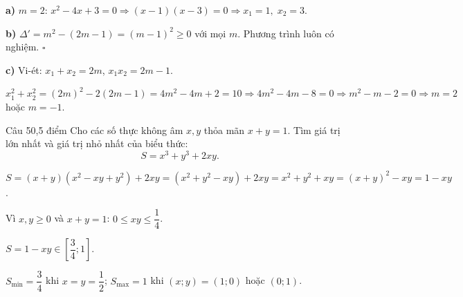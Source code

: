 \begin{loi_giai_cau}
\textbf{a)} $m=2$: $x^2-4x+3=0\Rightarrow(x-1)(x-3)=0\Rightarrow\boxed{x_1=1,\;x_2=3}$.

\textbf{b)} $\Delta'=m^2-(2m-1)=(m-1)^2\ge0$ với mọi $m$. Phương trình luôn có nghiệm. $\square$

\textbf{c)} Vi-ét: $x_1+x_2=2m$, $x_1x_2=2m-1$.

$x_1^2+x_2^2=(2m)^2-2(2m-1)=4m^2-4m+2=10\Rightarrow4m^2-4m-8=0\Rightarrow m^2-m-2=0\Rightarrow\boxed{m=2}$ hoặc $\boxed{m=-1}$.
\end{loi_giai_cau}

\begin{de_cau}{Câu 5}{0,5 điểm}
Cho các số thực không âm $x, y$ thỏa mãn $x + y = 1$. Tìm giá trị lớn nhất và giá trị nhỏ nhất của biểu thức:
\[S = x^3 + y^3 + 2xy.\]
\end{de_cau}

\begin{loi_giai_cau}
$S=(x+y)(x^2-xy+y^2)+2xy=(x^2+y^2-xy)+2xy=x^2+y^2+xy=(x+y)^2-xy=1-xy$.

Vì $x,y\ge0$ và $x+y=1$: $0\le xy\le\dfrac{1}{4}$.

$S=1-xy\in\left[\dfrac{3}{4};1\right]$.

$S_{\min}=\boxed{\dfrac{3}{4}}$ khi $x=y=\dfrac{1}{2}$; $S_{\max}=\boxed{1}$ khi $(x;y)=(1;0)$ hoặc $(0;1)$.
\end{loi_giai_cau}
